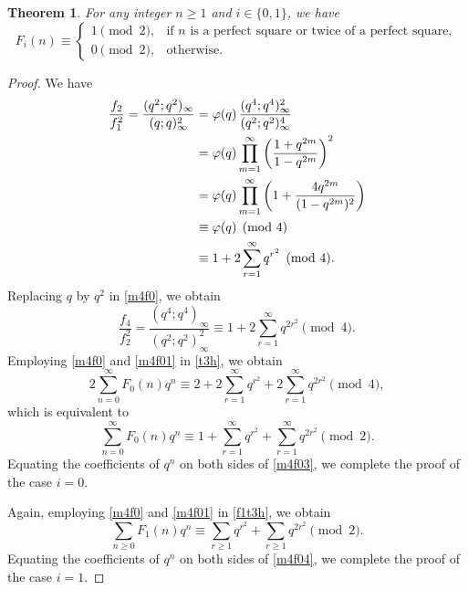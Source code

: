 \documentclass[12pt]{article}
\numberwithin{equation}{section}
\newtheorem{theorem}{Theorem}[section]
\theoremstyle{definition}
\theoremstyle{remark}
\numberwithin{equation}{section}
\begin{document}
\begin{theorem}\label{TM2}For any integer $n\ge1$ and $i\in\{0, 1\}$, we have
 \begin{equation}\label{Tm2}
F_{i}(n)\equiv
\begin{cases}
1 \pmod 2, & \text{if } n \text{ is a perfect square or twice of a perfect square},\\[4pt]
0 \pmod 2, & \text{otherwise}.
\end{cases}    
\end{equation}
\end{theorem}
\begin{proof}We have
\begin{align}
\dfrac{f_2}{f_1^2}=\dfrac{(q^2;q^2)_\infty}{(q;q)_\infty^2}
&=
\varphi(q)\,
\dfrac{(q^4;q^4)_\infty^2}{(q^2;q^2)_\infty^4} \notag \\
&=
\varphi(q)
\prod_{m=1}^\infty
\left(\dfrac{1+q^{2m}}{1-q^{2m}}\right)^2\notag\\
&=\varphi(q)\prod_{m=1}^\infty\left(1+\dfrac{4q^{2m}}{(1-q^{2m})^2}\right)\notag\\
&\equiv \varphi(q) \pmod 4\notag\\
&\label{m4f0}\equiv
1+2\sum_{r=1}^\infty q^{r^2}
\pmod 4.
\end{align}
Replacing $q$ by $q^2$ in \eqref{m4f0}, we obtain 
\begin{equation}\label{m4f01}
    \dfrac{f_4}{f_2^2}= \dfrac{(q^4;q^4)_\infty}{(q^2;q^2)_\infty^2}\equiv1+2\sum_{r=1}^{\infty}q^{2r^2}
\pmod 4.
\end{equation}
Employing \eqref{m4f0} and \eqref{m4f01} in \eqref{t3h}, we obtain
\begin{equation}\label{m4f02}
    2\sum_{n= 0}^\infty F_0(n)q^n\equiv2+2\sum_{r=1}^\infty q^{r^2}+2\sum_{r=1}^\infty q^{2r^2}\pmod 4, 
\end{equation}
which is equivalent to
\begin{equation}\label{m4f03}
    \sum_{n=0}^\infty F_0(n)q^n \equiv1+\sum_{r=1}^\infty q^{r^2}+\sum_{r=1}^\infty q^{2r^2}\pmod 2. 
\end{equation}Equating the coefficients of $q^n$ on both sides of \eqref{m4f03}, we complete the proof of the case $i=0$.

Again, employing \eqref{m4f0} and \eqref{m4f01} in \eqref{f1t3h}, we obtain
\begin{equation}\label{m4f04}
    \sum_{n\geq 0}F_1(n)q^n \equiv\sum_{r\geq1}q^{r^2}+\sum_{r\geq1}q^{2r^2}\pmod 2. 
\end{equation}
Equating the coefficients of $q^n$ on both sides of \eqref{m4f04}, we complete the proof of the case $i=1$.
\end{proof}
\end{document}
